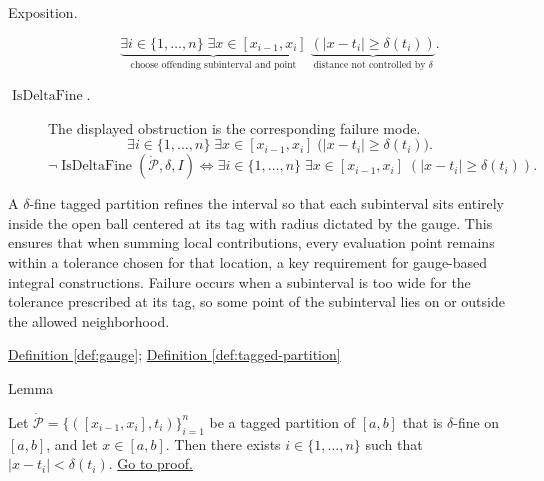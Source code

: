 \begin{remark*}
\begin{description}
  \item[Exposition.]
\[
\underbrace{\exists i \in \{1,\dots,n\}\;\exists x \in [x_{i-1},x_i]}_{\text{choose offending subinterval and point}}
\;\underbrace{(|x-t_i|\ge \delta(t_i))}_{\text{distance not controlled by }\delta}.
\]


  \item[\(\operatorname{IsDeltaFine}.\)]
  The displayed obstruction is the corresponding failure mode.
  \[
\exists i \in \{1,\dots,n\}\;\exists x \in [x_{i-1},x_i]\;
\bigl(|x-t_i|\ge \delta(t_i)\bigr).
  \]
  \[
\neg \operatorname{IsDeltaFine}(\dot{\mathcal{P}},\delta,I) \Longleftrightarrow \exists i \in \{1,\dots,n\}\;\exists x \in [x_{i-1},x_i]\;( |x-t_i|\ge \delta(t_i)).
  \]
\end{description}
\end{remark*}

\begin{remark*}[Interpretation]
A $\delta$-fine tagged partition refines the interval so that each subinterval sits entirely inside the open ball centered at its tag with radius dictated by the gauge. This ensures that when summing local contributions, every evaluation point remains within a tolerance chosen for that location, a key requirement for gauge-based integral constructions. Failure occurs when a subinterval is too wide for the tolerance prescribed at its tag, so some point of the subinterval lies on or outside the allowed neighborhood.
\end{remark*}

\begin{dependencies}
\hyperref[def:gauge]{Definition \ref*{def:gauge}}; \hyperref[def:tagged-partition]{Definition \ref*{def:tagged-partition}}
\end{dependencies}


\begin{lemmabox}{Lemma}
\begin{lemma}
\label{lem:every-point-covered-by-tag}
Let $\dot{\mathcal{P}}=\{([x_{i-1},x_i],t_i)\}_{i=1}^n$ be a tagged partition of $[a,b]$ that is $\delta$-fine on $[a,b]$, and let $x\in[a,b]$. Then there exists $i\in\{1,\ldots,n\}$ such that $|x-t_i|<\delta(t_i)$.
\hyperref[prf:every-point-covered-by-tag]{Go to proof.}
\end{lemma}
\end{lemmabox}

